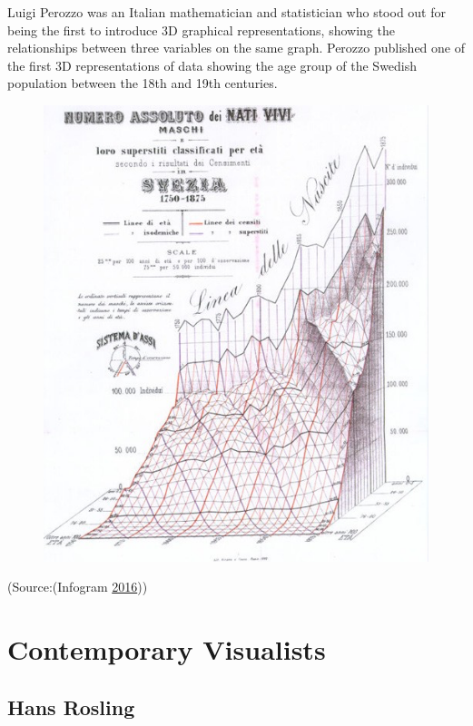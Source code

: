 \documentclass[]{book}
\theoremstyle{definition}
\theoremstyle{definition}
\theoremstyle{definition}
\theoremstyle{remark}
\begin{document}
Luigi Perozzo was an Italian mathematician and statistician who stood
out for being the first to introduce 3D graphical representations,
showing the relationships between three variables on the same graph.
Perozzo published one of the first 3D representations of data showing
the age group of the Swedish population between the 18th and 19th
centuries.

\begin{figure}
\centering
\includegraphics{images/Luigi.png}
\caption{}
\end{figure}

(Source:(Infogram \protect\hyperlink{ref-history_viz}{2016}))

\section{Contemporary Visualists}\label{contemporary-visualists-1}

\subsection{Hans Rosling}\label{hans-rosling-1}
\end{document}
